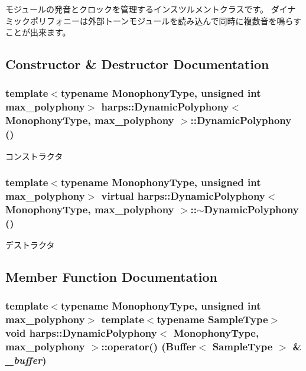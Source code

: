 モジュールの発音とクロックを管理するインスツルメントクラスです。 ダイナミックポリフォニーは外部トーンモジュールを読み込んで同時に複数音を鳴らすことが出来ます。 

\subsection{Constructor \& Destructor Documentation}
\subsubsection[DynamicPolyphony]{\setlength{\rightskip}{0pt plus 5cm}template$<$typename MonophonyType, unsigned int max\_\-polyphony$>$ {\bf harps::DynamicPolyphony}$<$ MonophonyType, max\_\-polyphony $>$::{\bf DynamicPolyphony} ()\hspace{0.3cm}{\tt  [inline]}}\label{classharps_1_1DynamicPolyphony_c15bc693840c9fee92b45a46c61db43d}


コンストラクタ 
\subsubsection[$\sim$DynamicPolyphony]{\setlength{\rightskip}{0pt plus 5cm}template$<$typename MonophonyType, unsigned int max\_\-polyphony$>$ virtual {\bf harps::DynamicPolyphony}$<$ MonophonyType, max\_\-polyphony $>$::$\sim${\bf DynamicPolyphony} ()\hspace{0.3cm}{\tt  [inline, virtual]}}\label{classharps_1_1DynamicPolyphony_ca69bdfdc3a1629b7abbea24b6444ac9}


デストラクタ 

\subsection{Member Function Documentation}
\subsubsection[operator()]{\setlength{\rightskip}{0pt plus 5cm}template$<$typename MonophonyType, unsigned int max\_\-polyphony$>$ template$<$typename SampleType$>$ void {\bf harps::DynamicPolyphony}$<$ MonophonyType, max\_\-polyphony $>$::operator() ({\bf Buffer}$<$ SampleType $>$ \& {\em \_\-buffer})\hspace{0.3cm}{\tt  [inline]}}\label{classharps_1_1DynamicPolyphony_3a2597029685d470e88e32a2ce3db94a}


